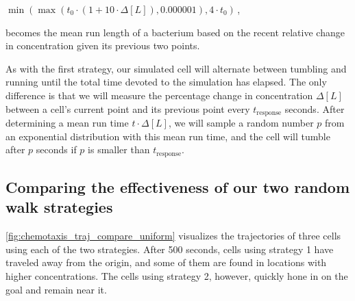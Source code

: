 \begin{center}
$\min\left(\max(t_0 \cdot (1 + 10 \cdot \Delta [L]), 0.000001), 4 \cdot t_0\right)$\,,
\end{center}

\noindent becomes the mean run length of a bacterium based on the recent relative change in concentration given its previous two points.\\

\begin{qbox}\end{qbox}

As with the first strategy, our simulated cell will alternate between tumbling and running until the total time devoted to the simulation has elapsed. The only difference is that we will measure the percentage change in concentration $\Delta [L]$ between a cell's current point and its previous point every $t_{\text{response}}$ seconds. After determining a mean run time $t \cdot \Delta [L]$, we will sample a random number $p$ from an exponential distribution with this mean run time, and the cell will tumble after $p$ seconds if $p$ is smaller than $t_{\text{response}}$.

\FloatBarrier
{}
\subsection{Comparing the effectiveness of our two random walk strategies}

\autoref{fig:chemotaxis_traj_compare_uniform} visualizes the trajectories of three cells using each of the two strategies. After 500 seconds, cells using strategy 1 have traveled away from the origin, and some of them are found in locations with higher concentrations. The cells using strategy 2, however, quickly hone in on the goal and remain near it.

